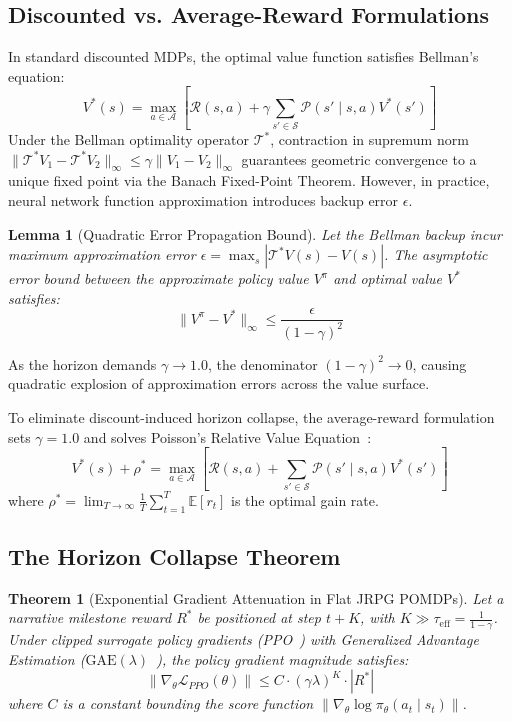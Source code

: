 \documentclass[journal,10pt,twocolumn]{IEEEtran}
\newtheorem{theorem}{Theorem}
\newtheorem{lemma}{Lemma}
\begin{document}
\subsection{Discounted vs. Average-Reward Formulations}
In standard discounted MDPs, the optimal value function satisfies Bellman's equation:
\begin{equation}
V^*(s) = \max_{a \in \mathcal{A}} \left[ \mathcal{R}(s, a) + \gamma \sum_{s' \in \mathcal{S}} \mathcal{P}(s' \mid s, a) V^*(s') \right]
\end{equation}
Under the Bellman optimality operator $\mathcal{T}^*$, contraction in supremum norm $\|\mathcal{T}^* V_1 - \mathcal{T}^* V_2\|_\infty \le \gamma \|V_1 - V_2\|_\infty$ guarantees geometric convergence to a unique fixed point via the Banach Fixed-Point Theorem. However, in practice, neural network function approximation introduces backup error $\epsilon$. 

\begin{lemma}[Quadratic Error Propagation Bound]
Let the Bellman backup incur maximum approximation error $\epsilon = \max_{s} |\mathcal{T}^* V(s) - V(s)|$. The asymptotic error bound between the approximate policy value $V^\pi$ and optimal value $V^*$ satisfies:
\begin{equation}
\|V^\pi - V^*\|_\infty \le \frac{\epsilon}{(1 - \gamma)^2}
\end{equation}
\end{lemma}
As the horizon demands $\gamma \to 1.0$, the denominator $(1 - \gamma)^2 \to 0$, causing quadratic explosion of approximation errors across the value surface.

To eliminate discount-induced horizon collapse, the average-reward formulation sets $\gamma = 1.0$ and solves Poisson's Relative Value Equation~\cite{oh2025discorl}:
\begin{equation}
V^*(s) + \rho^* = \max_{a \in \mathcal{A}} \left[ \mathcal{R}(s, a) + \sum_{s' \in \mathcal{S}} \mathcal{P}(s' \mid s, a) V^*(s') \right]
\end{equation}
where $\rho^* = \lim_{T \to \infty} \frac{1}{T} \sum_{t=1}^T \mathbb{E}[r_t]$ is the optimal gain rate.

\subsection{The Horizon Collapse Theorem}
\begin{theorem}[Exponential Gradient Attenuation in Flat JRPG POMDPs]
\label{thm:horizon_collapse}
Let a narrative milestone reward $R^*$ be positioned at step $t + K$, with $K \gg \tau_{\text{eff}} = \frac{1}{1 - \gamma}$. Under clipped surrogate policy gradients (PPO~\cite{schulman2017ppo}) with Generalized Advantage Estimation ($\text{GAE}(\lambda)$~\cite{schulman2016gae}), the policy gradient magnitude satisfies:
\begin{equation}
\left\| \nabla_\theta \mathcal{L}_{PPO}(\theta) \right\| \le C \cdot (\gamma \lambda)^K \cdot |R^*|
\end{equation}
where $C$ is a constant bounding the score function $\|\nabla_\theta \log \pi_\theta(a_t \mid s_t)\|$.
\end{theorem}
\end{document}
